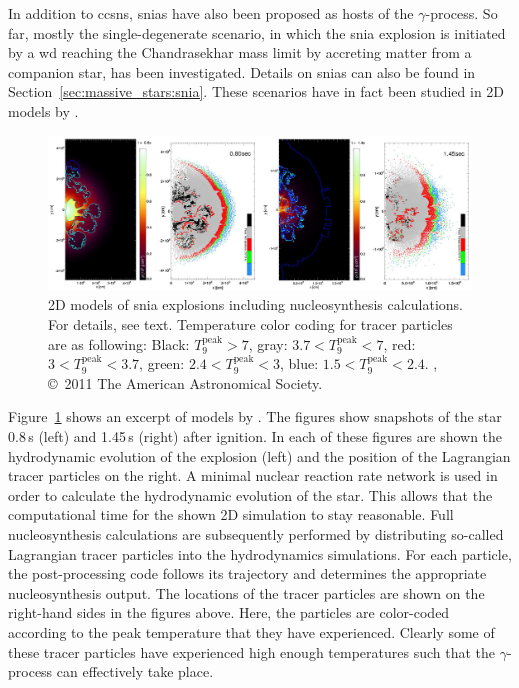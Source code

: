 In addition to \acp{ccsn}, \acp{snia} have also been proposed as hosts of the $\gamma$-process. So far, mostly the single-degenerate scenario, in which the \ac{snia} explosion is initiated by a \ac{wd} reaching the Chandrasekhar mass limit by accreting matter from a companion star, has been investigated. Details on \acp{snia} can also be found in Section~\ref{sec:massive_stars:snia}. These scenarios have in fact been studied in 2D models by \citet{travaglio11}.
\begin{figure}[tb]
    \centering
    \includegraphics[width=\textwidth]{graphics/p-nuclei/snia_2d_models}
    \caption{2D models of \ac{snia} explosions including nucleosynthesis calculations. For details, see text. Temperature color coding for tracer particles are as following: Black: $T_9^\mathrm{peak} >7$, gray: $3.7 < T_9^\mathrm{peak} < 7$, red: $3< T_9^\mathrm{peak} < 3.7$, green: $2.4< T_9^\mathrm{peak} < 3$, blue: $1.5< T_9^\mathrm{peak} < 2.4$. \citet{travaglio11}, \copyright\ 2011 The American Astronomical Society.}
    \label{fig:p-nuclei:snia_2d_models}
\end{figure}
Figure~\ref{fig:p-nuclei:snia_2d_models} shows an excerpt of models by \citet{travaglio11}. The figures show snapshots of the star 0.8\,s (left) and 1.45\,s (right) after ignition. In each of these figures are shown the hydrodynamic evolution of the explosion (left) and the position of the Lagrangian tracer particles on the right. A minimal nuclear reaction rate network is used in order to calculate the hydrodynamic evolution of the star. This allows that the computational time for the shown 2D simulation to stay reasonable. Full nucleosynthesis calculations are subsequently performed by distributing so-called Lagrangian tracer particles into the hydrodynamics simulations. For each particle, the post-processing code follows its trajectory and determines the appropriate nucleosynthesis output. The locations of the tracer particles are shown on the right-hand sides in the figures above. Here, the particles are color-coded according to the peak temperature that they have experienced. Clearly some of these tracer particles have experienced high enough temperatures such that the $\gamma$-process can effectively take place. 

